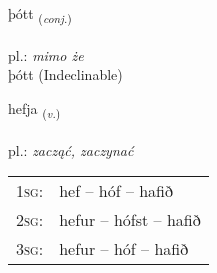 \documentclass[frontgrid, backgrid]{flacards}\usepackage[]{graphicx}\usepackage[]{xcolor}
\begin{document}

\renewcommand{\flhead}{\vskip5pt \fboxsep=0pt {\small\bfseries\footnotesize Samtenging | spójnik}}
\renewcommand{\fcfoot}{\vskip5pt \fboxsep=0pt \hspace{2pt}{\small\bfseries\footnotesize 1K}}

\renewcommand{\blhead}{\vskip5pt {\small\bfseries\footnotesize Samtenging | spójnik }}
\renewcommand{\bcfoot}{\vskip5pt \hspace{2pt}{\small\bfseries\footnotesize 1K}}


{þótt \small{\textsubscript{(\textit{conj.})}} \\[1ex]
\textphonetic{[θouht]} \\
pl.: \emph{mimo że} \\  [2ex]
þótt (Indeclinable)}

\renewcommand{\flhead}{\vskip5pt \fboxsep=0pt {\small\bfseries\footnotesize Sagnorð | czasownik}}
\renewcommand{\fcfoot}{\vskip5pt \fboxsep=0pt \hspace{2pt}{\small\bfseries\footnotesize 1K}}

\renewcommand{\blhead}{\vskip5pt {\small\bfseries\footnotesize Sagnorð | czasownik }}
\renewcommand{\bcfoot}{\vskip5pt \hspace{2pt}{\small\bfseries\footnotesize 1K}}


{hefja \small{\textsubscript{(\textit{v.})}} \\[1ex] %
\textphonetic{[hɛvja]} \\
pl.: \emph{zacząć, zaczynać} \\  [2ex]
\renewcommand*{\arraystretch}{0.8}
\begin{tabular}{p{1cm}l}
\textsc{1sg}: & hef -- hóf -- hafið \\ 
\textsc{2sg}: & hefur -- hófst -- hafið \\ 
\textsc{3sg}: & hefur -- hóf -- hafið \\ 
\end{tabular}
}

\end{document}
